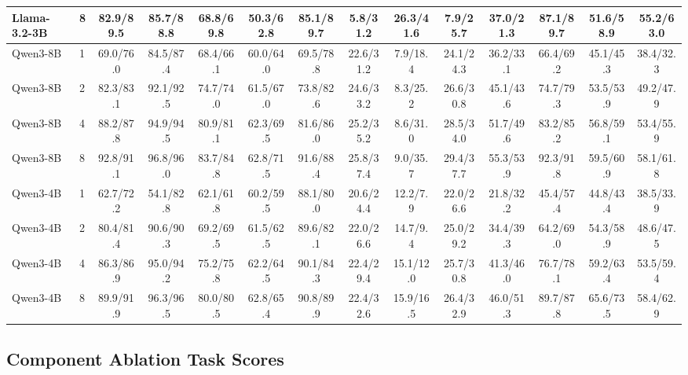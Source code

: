 \begin{table}[!htbp]
{\begin{tabular}{llcccccccccccc}
Llama-3.2-3B & 8 & 82.9/89.5 & 85.7/88.8 & 68.8/69.8 & 50.3/62.8 & 85.1/89.7 & 5.8/31.2 & 26.3/41.6 & 7.9/25.7 & 37.0/21.3 & 87.1/89.7 & 51.6/58.9 & 55.2/63.0 \\
\midrule
Qwen3-8B & 1 & 69.0/76.0 & 84.5/87.4 & 68.4/66.1 & 60.0/64.0 & 69.5/78.8 & 22.6/31.2 & 7.9/18.4 & 24.1/24.3 & 36.2/33.1 & 66.4/69.2 & 45.1/45.3 & 38.4/32.3 \\
Qwen3-8B & 2 & 82.3/83.1 & 92.1/92.5 & 74.7/74.0 & 61.5/67.0 & 73.8/82.6 & 24.6/33.2 & 8.3/25.2 & 26.6/30.8 & 45.1/43.6 & 74.7/79.3 & 53.5/53.9 & 49.2/47.9 \\
Qwen3-8B & 4 & 88.2/87.8 & 94.9/94.5 & 80.9/81.1 & 62.3/69.5 & 81.6/86.0 & 25.2/35.2 & 8.6/31.0 & 28.5/34.0 & 51.7/49.6 & 83.2/85.2 & 56.8/59.1 & 53.4/55.9 \\
Qwen3-8B & 8 & 92.8/91.1 & 96.8/96.0 & 83.7/84.8 & 62.8/71.5 & 91.6/88.4 & 25.8/37.4 & 9.0/35.7 & 29.4/37.7 & 55.3/53.9 & 92.3/91.8 & 59.5/60.9 & 58.1/61.8 \\
\midrule
Qwen3-4B & 1 & 62.7/72.2 & 54.1/82.8 & 62.1/61.8 & 60.2/59.5 & 88.1/80.0 & 20.6/24.4 & 12.2/7.9 & 22.0/26.6 & 21.8/32.2 & 45.4/57.4 & 44.8/43.4 & 38.5/33.9 \\
Qwen3-4B & 2 & 80.4/81.4 & 90.6/90.3 & 69.2/69.5 & 61.5/62.5 & 89.6/82.1 & 22.0/26.6 & 14.7/9.4 & 25.0/29.2 & 34.4/39.3 & 64.2/69.0 & 54.3/58.9 & 48.6/47.5 \\
Qwen3-4B & 4 & 86.3/86.9 & 95.0/94.2 & 75.2/75.8 & 62.2/64.5 & 90.1/84.3 & 22.4/29.4 & 15.1/12.0 & 25.7/30.8 & 41.3/46.0 & 76.7/78.1 & 59.2/63.4 & 53.5/59.4 \\
Qwen3-4B & 8 & 89.9/91.9 & 96.3/96.5 & 80.0/80.5 & 62.8/65.4 & 90.8/89.9 & 22.4/32.6 & 15.9/16.5 & 26.4/32.9 & 46.0/51.3 & 89.7/87.8 & 65.6/73.5 & 58.4/62.9 \\
\bottomrule
\end{tabular}%
}
\end{table}

\FloatBarrier

\subsection{Component Ablation Task Scores}
\label{app:ablation-task-scores}

